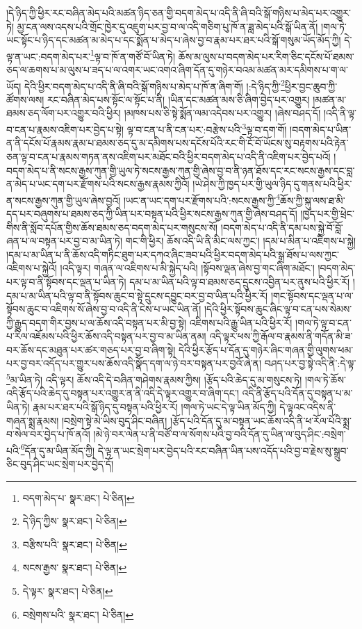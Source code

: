 །དེ་ཉིད་ཀྱི་ཕྱིར་རང་བཞིན་མེད་པའི་མཚན་ཉིད་ཅན་གྱི་བདག་མེད་པ་འདི་ནི་ཞི་བའི་སྒོ་གཉིས་པ་མེད་པར་འགྱུར་ཏེ། མྱ་ངན་ལས་འདས་པའི་གྲོང་ཁྱེར་དུ་འཇུག་པར་བྱ་བ་ལ་འདི་གཅིག་པུ་ཁོ་ན་ཟླ་མེད་པའི་སྒོ་ཡིན་ནོ། །གལ་ཏེ་ཡང་སྟོང་པ་ཉིད་དང་མཚན་མ་མེད་པ་དང་སྨོན་པ་མེད་པ་ཞེས་བྱ་བ་རྣམ་པར་ཐར་པའི་སྒོ་གསུམ་ཡོད་མོད་ཀྱི། དེ་ལྟ་ན་ཡང་:བདག་མེད་པར་\footnote{བདག་མེད་པ་  སྣར་ཐང་།  པེ་ཅིན། }ལྟ་བ་ཁོ་ན་གཙོ་བོ་ཡིན་ཏེ། ཆོས་མ་ལུས་པ་བདག་མེད་པར་རིག་ཅིང་དངོས་པོ་ཐམས་ཅད་ལ་ཆགས་པ་མ་ལུས་པ་ཟད་པ་ལ་འགར་ཡང་འགའ་ཞིག་དོན་དུ་གཉེར་བའམ་མཚན་མར་དམིགས་པ་ག་ལ་ཡོད། དེའི་ཕྱིར་བདག་མེད་པ་འདི་ནི་ཞི་བའི་སྒོ་གཉིས་པ་མེད་པ་ཁོ་ན་ཞིག་གོ། །:དེ་ཉིད་ཀྱི་\footnote{དེ་ཉིད་ཀྱིས་  སྣར་ཐང་།  པེ་ཅིན། }ཕྱིར་བྱང་ཆུབ་ཀྱི་ཚོགས་ལས། རང་བཞིན་མེད་པས་སྟོང་ལ་སྟོང་པ་ནི། །ཡིན་དང་མཚན་མས་ཅི་ཞིག་བྱེད་པར་འགྱུར། །མཚན་མ་ཐམས་ཅད་ལོག་པར་འགྱུར་བའི་ཕྱིར། །མཁས་པས་ཅི་སྟེ་སྨོན་ལམ་འདེབས་པར་འགྱུར། །ཞེས་བཤད་དོ། །འདི་ནི་ལྟ་བ་ངན་པ་རྣམས་འཇིག་པར་བྱེད་པ་སྟེ། ལྟ་བ་ངན་པ་ནི་ངན་པར་:བརྩེས་པའི་\footnote{བརྩིས་པའི་  སྣར་ཐང་།  པེ་ཅིན། }ལྟ་བ་དག་གོ། །བདག་མེད་པ་ཡིན་ན་ནི་དངོས་པོ་རྣམས་རྣམ་པ་ཐམས་ཅད་དུ་མ་དམིགས་པས་དངོས་པོའི་རང་གི་ངོ་བོ་ཡོངས་སུ་བརྟགས་པའི་རྟེན་ཅན་ལྟ་བ་ངན་པ་རྣམས་གཏན་ནས་འཇིག་པར་མཐོང་བའི་ཕྱིར་བདག་མེད་པ་འདི་ནི་འཇིག་པར་བྱེད་པའོ། །བདག་མེད་པ་ནི་སངས་རྒྱས་ཀུན་གྱི་ཡུལ་ཏེ་སངས་རྒྱས་ཀུན་གྱི་ཞེས་བྱ་བ་ནི་ཉན་ཐོས་དང་རང་སངས་རྒྱས་དང་བླ་ན་མེད་པ་ཡང་དག་པར་རྫོགས་པའི་སངས་རྒྱས་རྣམས་ཀྱིའོ། །ཡེ་ཤེས་ཀྱི་ཁྱད་པར་གྱི་ཡུལ་ཉིད་དུ་གནས་པའི་ཕྱིར་ན་སངས་རྒྱས་ཀུན་གྱི་ཡུལ་ཞེས་བྱའོ། །ཡང་ན་ཡང་དག་པར་རྫོགས་པའི་:སངས་རྒྱས་ཀྱི་\footnote{སངས་རྒྱས་  སྣར་ཐང་།  པེ་ཅིན། }ཆོས་ཀྱི་སྐུ་ལས་ཐ་མི་དད་པར་བཞུགས་པ་ཐམས་ཅད་ཀྱི་ཡིན་པར་བསྟན་པའི་ཕྱིར་སངས་རྒྱས་ཀུན་གྱི་ཞེས་བཤད་དོ། །ཁྱད་པར་གྱི་ཕྲེང་གིས་ནི་སློབ་དཔོན་གྱིས་ཆོས་ཐམས་ཅད་བདག་མེད་པར་གསུངས་སོ། །བདག་མེད་པ་འདི་ནི་དམ་པས་སྐྱེ་བོ་བློ་ཞན་པ་ལ་བསྟན་པར་བྱ་བ་མ་ཡིན་ཏེ། གང་གི་ཕྱིར། ཆོས་འདི་ཡི་ནི་མིང་ལས་ཀྱང་། །དམ་པ་མིན་པ་འཇིགས་པ་སྐྱེ། །དམ་པ་མ་ཡིན་པ་ནི་ཆོས་འདི་གཏིང་ཐུག་པར་དཀའ་ཞིང་ཟབ་པའི་ཕྱིར་བདག་མེད་པའི་སྒྲ་ཐོས་པ་ལས་ཀྱང་འཇིགས་པ་སྐྱེའོ། །འདི་ལྟར། གཞན་ལ་འཇིགས་པ་མི་སྐྱེད་པའི། །སྟོབས་ལྡན་ཞེས་བྱ་གང་ཞིག་མཐོང་། །བདག་མེད་པར་ལྟ་བ་ནི་སྟོབས་དང་ལྡན་པ་ཡིན་ཏེ། དམ་པ་མ་ཡིན་པའི་ལྟ་བ་ཐམས་ཅད་དྲུངས་འབྱིན་པར་ནུས་པའི་ཕྱིར་རོ། །དམ་པ་མ་ཡིན་པའི་ལྟ་བ་ནི་སྟོབས་ཆུང་བ་སྟེ་དྲུངས་དབྱུང་བར་བྱ་བ་ཡིན་པའི་ཕྱིར་རོ། །གང་སྟོབས་དང་ལྡན་པ་ལ་སྟོབས་ཆུང་བ་འཇིགས་སོ་ཞེས་བྱ་བ་འདི་ནི་ངེས་པ་ཡང་ཡིན་ནོ། །དེའི་ཕྱིར་སྟོབས་ཆུང་ཞིང་ལྟ་བ་ངན་པས་སེམས་ཀྱི་རྒྱུད་བདག་གིར་བྱས་པ་ལ་ཆོས་འདི་བསྟན་པར་མི་བྱ་སྟེ། འཇིགས་པའི་རྒྱུ་ཡིན་པའི་ཕྱིར་རོ། །གལ་ཏེ་ལྟ་བ་ངན་པ་རིལ་འཇོམས་པའི་ཕྱིར་ཆོས་འདི་བསྟན་པར་བྱ་བ་མ་ཡིན་ནམ། འདི་ལྟར་ཕས་ཀྱི་རྒོལ་བ་རྣམས་ནི་གདོན་མི་ཟ་བར་ཆོས་དང་མཐུན་པར་ཚར་གཅད་པར་བྱ་བ་ཞིག་སྟེ། དེའི་ཕྱིར་རྩོད་པ་དོན་དུ་གཉེར་ཞིང་གཞན་གྱི་ལུགས་ཕམ་པར་བྱ་བར་འདོད་པར་གྱུར་པས་ཆོས་འདི་སྣོད་དག་ལ་ཉེ་བར་བསྟན་པར་བྱའོ་ཞེ་ན། བཤད་པར་བྱ་སྟེ་འདི་ནི་:དེ་ལྟ་\footnote{དེ་ལྟར་  སྣར་ཐང་།  པེ་ཅིན། }མ་ཡིན་ཏེ། འདི་ལྟར། ཆོས་འདི་དེ་བཞིན་གཤེགས་རྣམས་ཀྱིས། །རྩོད་པའི་ཆེད་དུ་མ་གསུངས་ཏེ། །གལ་ཏེ་ཆོས་འདི་རྩོད་པའི་ཆེད་དུ་བསྟན་པར་འགྱུར་ན་ནི་འདི་དེ་ལྟར་འགྱུར་བ་ཞིག་དང་། འདི་ནི་རྩོད་པའི་དོན་དུ་བསྟན་པ་མ་ཡིན་ཏེ། རྣམ་པར་ཐར་པའི་སྒོ་ཉིད་དུ་བསྟན་པའི་ཕྱིར་རོ། །གལ་ཏེ་ཡང་དེ་ལྟ་ཡིན་མོད་ཀྱི། དེ་ལྟའང་འདིས་ནི་གཞན་སྨྲ་རྣམས། །བསྲེག་སྟེ་མེ་ཡིས་བུད་ཤིང་བཞིན། །རྩོད་པའི་དོན་དུ་མ་བསྟན་ཡང་ཆོས་འདི་ནི་ཕ་རོལ་པོའི་སྨྲ་བ་སེལ་བར་བྱེད་པ་ཁོ་ནའོ། །མེ་ཉེ་བར་ལེན་པ་ནི་བཙོ་བ་ལ་སོགས་པའི་བྱ་བའི་དོན་དུ་ཡིན་ལ་བུད་ཤིང་:བསྲེག་པའི་\footnote{བསྲེགས་པའི་  སྣར་ཐང་།  པེ་ཅིན། }དོན་དུ་མ་ཡིན་མོད་ཀྱི། དེ་ལྟ་ན་ཡང་སྲེག་པར་བྱེད་པའི་རང་བཞིན་ཡིན་པས་འདོད་པའི་བྱ་བ་རྗེས་སུ་སྒྲུབ་ཅིང་བུད་ཤིང་ཡང་སྲེག་པར་བྱེད་དོ། 